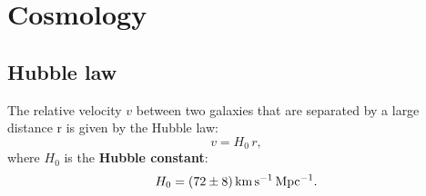 \chapter{Cosmology}


\section{Hubble law}
The relative velocity $v$ between two galaxies that are separated by a large distance r is given by the 
Hubble law:
\begin{equation}
   v = H_{0}\,r,
\end{equation}
where $H_{0}$ is the {\bf Hubble constant}:
\begin{equation}\label{eq:hubbleconst}
    H_{0} = (72 \pm 8)\,{\rm km\,s^{-1}\,Mpc^{-1}}.
\end{equation}


